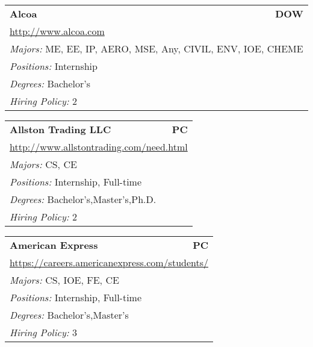 \documentclass[twoside]{article}
\begin{document}
\begin{center}
\begin{multicols}{3}
\begin{FlushLeft}
\begin{minipage}{.9\columnwidth}
\end{minipage}
 
\begin{minipage}{.9\columnwidth}\begin{tabularx}{.95\columnwidth}{Xr}
                 {\Large\bf Alcoa} & {\Large\bf DOW}\\
    \multicolumn{2}{p{.95\columnwidth}}{\url{http://www.alcoa.com}}\\
    \multicolumn{2}{p{.95\columnwidth}}{\emph{Majors:} ME, EE, IP, AERO, MSE, Any, CIVIL, ENV, IOE, CHEME}\\
    \multicolumn{2}{p{.95\columnwidth}}{\emph{Positions:} Internship}\\
    \multicolumn{2}{p{.95\columnwidth}}{\emph{Degrees:} Bachelor's}\\
    \multicolumn{2}{p{.95\columnwidth}}{\emph{Hiring Policy:} 2}\\
    \end{tabularx}
    
\end{minipage}
 
\begin{minipage}{.9\columnwidth}\begin{tabularx}{.95\columnwidth}{Xr}
                 {\Large\bf Allston Trading LLC} & {\Large\bf PC}\\
    \multicolumn{2}{p{.95\columnwidth}}{\url{http://www.allstontrading.com/need.html}}\\
    \multicolumn{2}{p{.95\columnwidth}}{\emph{Majors:} CS, CE}\\
    \multicolumn{2}{p{.95\columnwidth}}{\emph{Positions:} Internship, Full-time}\\
    \multicolumn{2}{p{.95\columnwidth}}{\emph{Degrees:} Bachelor's,Master's,Ph.D.}\\
    \multicolumn{2}{p{.95\columnwidth}}{\emph{Hiring Policy:} 2}\\
    \end{tabularx}
    
\end{minipage}
 
\begin{minipage}{.9\columnwidth}\begin{tabularx}{.95\columnwidth}{Xr}
                 {\Large\bf American Express} & {\Large\bf PC}\\
    \multicolumn{2}{p{.95\columnwidth}}{\url{https://careers.americanexpress.com/students/}}\\
    \multicolumn{2}{p{.95\columnwidth}}{\emph{Majors:} CS, IOE, FE, CE}\\
    \multicolumn{2}{p{.95\columnwidth}}{\emph{Positions:} Internship, Full-time}\\
    \multicolumn{2}{p{.95\columnwidth}}{\emph{Degrees:} Bachelor's,Master's}\\
    \multicolumn{2}{p{.95\columnwidth}}{\emph{Hiring Policy:} 3}\\
    \end{tabularx}
    

\end{minipage}
\end{FlushLeft}
\end{multicols}
\end{center}
\end{document}

